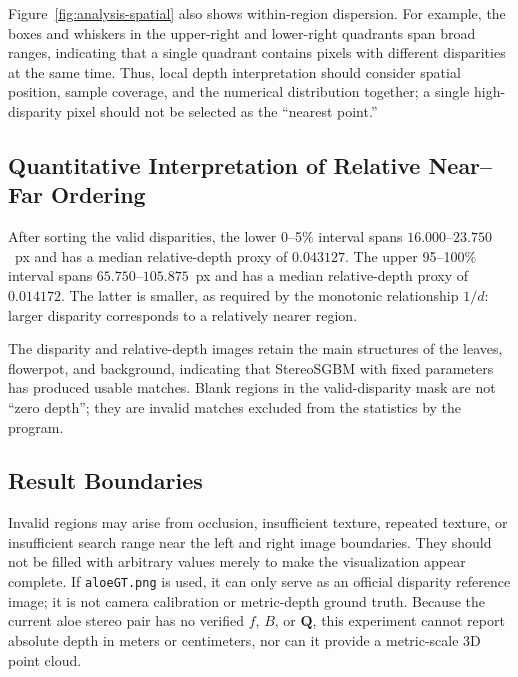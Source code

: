Figure~\ref{fig:analysis-spatial} also shows within-region dispersion. For example, the boxes and
whiskers in the upper-right and lower-right quadrants span broad ranges, indicating that a single
quadrant contains pixels with different disparities at the same time. Thus, local depth
interpretation should consider spatial position, sample coverage, and the numerical distribution
together; a single high-disparity pixel should not be selected as the ``nearest point.''

\subsection{Quantitative Interpretation of Relative Near--Far Ordering}

After sorting the valid disparities, the lower 0--5\% interval spans $16.000$--$23.750$~px and
has a median relative-depth proxy of $0.043127$. The upper 95--100\% interval spans
$65.750$--$105.875$~px and has a median relative-depth proxy of $0.014172$. The latter is smaller,
as required by the monotonic relationship $1/d$: larger disparity corresponds to a relatively nearer
region.

The disparity and relative-depth images retain the main structures of the leaves, flowerpot, and
background, indicating that StereoSGBM with fixed parameters has produced usable matches. Blank
regions in the valid-disparity mask are not ``zero depth''; they are invalid matches excluded from
the statistics by the program.

\subsection{Result Boundaries}

Invalid regions may arise from occlusion, insufficient texture, repeated texture, or insufficient
search range near the left and right image boundaries. They should not be filled with arbitrary
values merely to make the visualization appear complete. If \texttt{aloeGT.png} is used, it can
only serve as an official disparity reference image; it is not camera calibration or metric-depth
ground truth. Because the current aloe stereo pair has no verified $f$, $B$, or $\mathbf{Q}$, this
experiment cannot report absolute depth in meters or centimeters, nor can it provide a metric-scale
3D point cloud.
